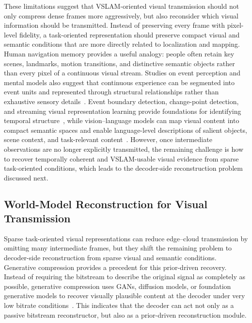 \documentclass[journal]{IEEEtran}
\begin{document}
These limitations suggest that VSLAM-oriented visual transmission should not only compress dense frames more aggressively, but also reconsider which visual information should be transmitted. Instead of preserving every frame with pixel-level fidelity, a task-oriented representation should preserve compact visual and semantic conditions that are more directly related to localization and mapping. Human navigation memory provides a useful analogy: people often retain key scenes, landmarks, motion transitions, and distinctive semantic objects rather than every pixel of a continuous visual stream. Studies on event perception and mental models also suggest that continuous experience can be segmented into event units and represented through structural relationships rather than exhaustive sensory details~\cite{zacks2001event,zacks2007event,johnsonlaird1983mental}. Event boundary detection, change-point detection, and streaming visual representation learning provide foundations for identifying temporal structure~\cite{shou2021gebd,adams2007bayesian,streamer2023}, while vision--language models can map visual content into compact semantic spaces and enable language-level descriptions of salient objects, scene context, and task-relevant content~\cite{radford2021clip,li2023blip2}. However, once intermediate observations are no longer explicitly transmitted, the remaining challenge is how to recover temporally coherent and VSLAM-usable visual evidence from sparse task-oriented conditions, which leads to the decoder-side reconstruction problem discussed next.

\subsection{World-Model Reconstruction for Visual Transmission}

Sparse task-oriented visual representations can reduce edge--cloud transmission by omitting many intermediate frames, but they shift the remaining problem to decoder-side reconstruction from sparse visual and semantic conditions. Generative compression provides a precedent for this prior-driven recovery. Instead of requiring the bitstream to describe the original signal as completely as possible, generative compression uses GANs, diffusion models, or foundation generative models to recover visually plausible content at the decoder under very low bitrate conditions~\cite{mentzer2020highfidelity}. This indicates that the decoder can act not only as a passive bitstream reconstructor, but also as a prior-driven reconstruction module.
\end{document}

